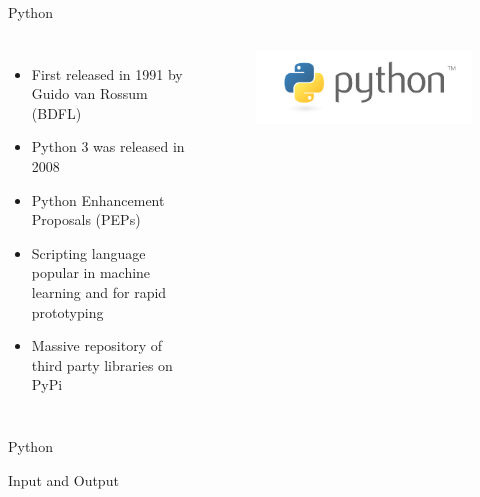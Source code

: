 \documentclass[aspectratio=169,xcolor=dvipsnames]{beamer}
\begin{document}

\begin{frame}{Python}
  \begin{columns}[c]
    \begin{itemize}
        \item First released in 1991 by Guido van Rossum (BDFL)
        \item Python 3 was released in 2008
        \item Python Enhancement Proposals (PEPs)
        \item Scripting language popular in machine learning and for rapid prototyping
        \item Massive repository of third party libraries on PyPi
    \end{itemize}

    \begin{figure}
        \includegraphics[width=1.0\textwidth]{imgs/python.png}
    \end{figure}
  \end{columns}
\end{frame}


\begin{frame}{Python}
  \begin{example}
    
  \end{example}
\end{frame}


\begin{frame}{Input and Output}
  \begin{example}
    
  \end{example}
\end{frame}

\end{document}
